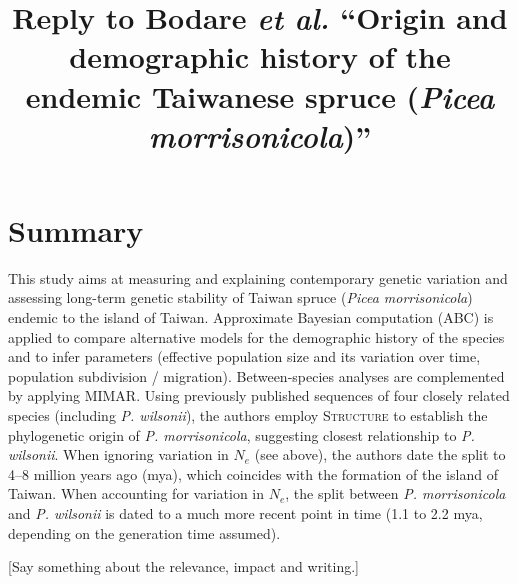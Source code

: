 \documentclass[11pt]{article}
\title{Reply to Bodare \emph{et al.} ``Origin and demographic history of the endemic Taiwanese spruce (\emph{Picea morrisonicola})''}
\begin{document}
\maketitle

\section{Summary}
This study aims at measuring and explaining contemporary genetic variation and assessing long-term genetic stability of Taiwan spruce (\emph{Picea morrisonicola}) endemic to the island of Taiwan. Approximate Bayesian computation (ABC) is applied to compare alternative models for the demographic history of the species and to infer parameters (effective population size and its variation over time, population subdivision / migration). Between-species analyses are complemented by applying MIMAR. Using previously published sequences of four closely related species (including \emph{P. wilsonii}), the authors employ \textsc{Structure} to establish the phylogenetic origin of \emph{P. morrisonicola}, suggesting closest relationship to \emph{P. wilsonii}. When ignoring variation in $N_{e}$ (see above), the authors date the split to 4--8 million years ago (mya), which coincides with the formation of the island of Taiwan. When accounting for variation in $N_e$, the split between \emph{P. morrisonicola} and \emph{P. wilsonii} is dated to a much more recent point in time (1.1 to 2.2 mya, depending on the generation time assumed).


[Say something about the relevance, impact and writing.]
\end{document}
